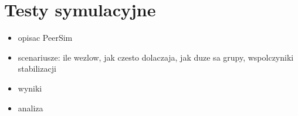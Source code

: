 \documentclass[12pt, twoside, openany]{report}
\begin{document}







\chapter{Testy symulacyjne}

\begin{itemize}
\item opisac PeerSim
\item scenariusze: ile wezlow, jak czesto dolaczaja, jak duze sa grupy, wspolczyniki stabilizacji
\item wyniki
\item analiza
\end{itemize}
\end{document}
